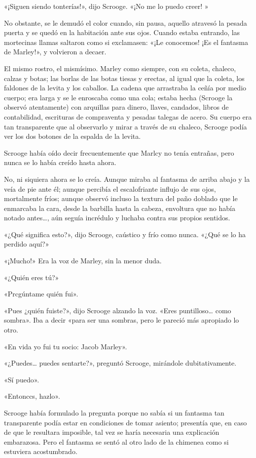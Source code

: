 \documentclass{novela}
\begin{document}
 «¡Siguen siendo tonterías!», dijo Scrooge. «¡No me lo puedo creer! »

 No obstante, se le demudó el color cuando, sin pausa, aquello atravesó la pesada puerta y se quedó en la habitación ante sus ojos. Cuando estaba entrando, las mortecinas llamas saltaron como si exclamasen: «¡Le conocemos! ¡Es el fantasma de Marley!», y volvieron a decaer.

 El mismo rostro, el mismísimo. Marley como siempre, con su coleta, chaleco, calzas y botas; las borlas de las botas tiesas y erectas, al igual que la coleta, los faldones de la levita y los caballos. La cadena que arrastraba la ceñía por medio cuerpo; era larga y se le enroscaba como una cola; estaba hecha (Scrooge la observó atentamente) con arquillas para dinero, llaves, candados, libros de contabilidad, escrituras de compraventa y pesadas talegas de acero. Su cuerpo era tan transparente que al observarlo y mirar a través de su chaleco, Scrooge podía ver los dos botones de la espalda de la levita.

 Scrooge había oído decir frecuentemente que Marlcy no tenía entrañas, pero nunca se lo había creído hasta ahora.

 No, ni siquiera ahora se lo creía. Aunque miraba al fantasma de arriba abajo y la veía de pie ante él; aunque percibía el escalofriante influjo de sus ojos, mortalmente fríos; aunque observó incluso la textura del paño doblado que le enmarcaba la cara, desde la barbilla hasta la cabeza, envoltura que no había notado antes{\ldots}, aún seguía incrédulo y luchaba contra sus propios sentidos.

 «¿Qué significa esto?», dijo Scrooge, caústico y frío como nunca. «¿Qué se lo ha perdido aquí?»

 «¡Mucho!» Era la voz de Marley, sin la menor duda.

 «¿Quién eres tú?»

 «Prcgúntame quién fui».

 «Pues ¿quién fuiste?», dijo Scrooge alzando la voz. «Eres puntilloso{\ldots} como sombra». Iba a decir «para ser una sombras, pero le pareció más apropiado lo otro.

 «En vida yo fui tu socio: Jacob Marley».

 «¿Puedes{\ldots} puedes sentarte?», preguntó Scrooge, mirándole dubitativamente.

 «Sí puedo».

 «Entonccs, hazlo».

 Scrooge había formulado la pregunta porque no sabía si un fantasma tan transparente podía estar en condiciones de tomar asiento; presentía que, en caso de que le resultara imposible, tal vez se haría necesaria una explicación embarazosa. Pero el fantasma se sentó al otro lado de la chimenea como si estuviera acostumbrado.
\end{document}
